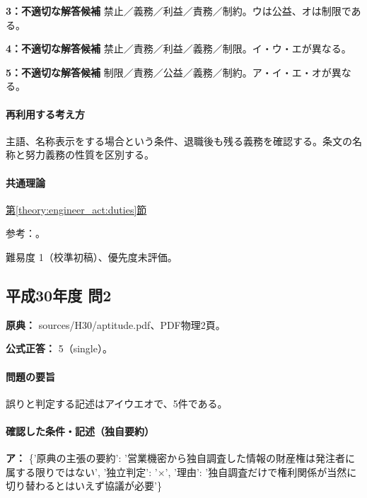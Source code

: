 \noindent\textbf{3：不適切な解答候補} 禁止／義務／利益／責務／制約。ウは公益、オは制限である。\par

\noindent\textbf{4：不適切な解答候補} 禁止／責務／利益／義務／制限。イ・ウ・エが異なる。\par

\noindent\textbf{5：不適切な解答候補} 制限／責務／公益／義務／制約。ア・イ・エ・オが異なる。\par

\paragraph{再利用する考え方} 主語、名称表示をする場合という条件、退職後も残る義務を確認する。条文の名称と努力義務の性質を区別する。

\paragraph{共通理論} \hyperref[theory:engineer_act:duties]{第\ref*{theory:engineer_act:duties}節}

\par 参考：\cite{engineer_act_current}。

\par 難易度 1（校準初稿）、優先度未評価。

\subsection{平成30年度 問2}
\label{q:h30-reg-apt-02}

\noindent\textbf{原典：} sources/H30/aptitude.pdf、PDF物理2頁。

\textbf{公式正答：} 5（single）。

\paragraph{問題の要旨} 誤りと判定する記述はアイウエオで、5件である。

\paragraph{確認した条件・記述（独自要約）}\mbox{}\par

\noindent\textbf{ア：} \{'原典の主張の要約': '営業機密から独自調査した情報の財産権は発注者に属する限りではない', '独立判定': '×', '理由': '独自調査だけで権利関係が当然に切り替わるとはいえず協議が必要'\}\par

